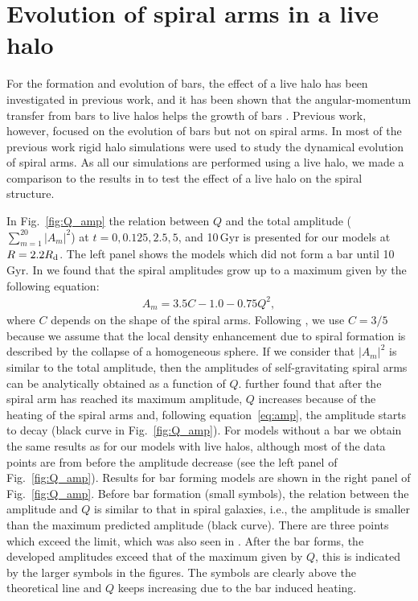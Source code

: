 

\section[]{Evolution of spiral arms in a live halo}
\label{Sect:AppB}

For the formation and evolution of bars, the effect of a
live halo has been investigated in previous work, and
it has been shown that the angular-momentum transfer from bars to
live halos helps the growth of bars
\citep{2000ApJ...543..704D,2002ApJ...569L..83A,2003MNRAS.341.1179A}.
Previous work, however, focused on the evolution of bars but
not on spiral arms. 
In most of the previous work rigid halo simulations were used
to study the dynamical evolution of spiral arms. As all
our simulations are performed using a live halo, we made
a comparison to the results in \citet{2011ApJ...730..109F}
to test the effect of a live halo on the spiral structure.


In Fig.~\ref{fig:Q_amp} the relation between $Q$ and
the total amplitude ($\sum _{m=1}^{20}|A_m|^2$) at  $t=0, 0.125, 2.5, 5$, 
and 10\,Gyr is presented for our models at $R=2.2R_{\rm d}$.
The left panel shows the models which did not form a bar until 10\,Gyr. 
In \citet{2011ApJ...730..109F} we found that the spiral amplitudes
grow up to a maximum given by the following equation:
\begin{eqnarray}
A_{m} = 3.5C - 1.0 - 0.75Q^2,
\label{eq:amp}
\end{eqnarray}
where $C$ depends on the shape of the spiral arms. 
Following \citet{2011ApJ...730..109F}, we use $C=3/5$ because we assume that the local 
density enhancement due to spiral formation is described by the collapse 
of a homogeneous sphere.
If we consider that $|A_m|^2$ is similar to
the total amplitude, then the amplitudes of self-gravitating 
spiral arms can be analytically obtained as a function of $Q$. 
\citet{2011ApJ...730..109F} further found that after the spiral arm has 
reached its maximum amplitude, $Q$ increases because of the heating of 
the spiral arms and, following equation~\ref{eq:amp}, the amplitude starts to 
decay (black curve in Fig.~\ref{fig:Q_amp}).
For models without a bar we obtain the same results as for our 
models with live halos, although most of the data points are from before 
the amplitude decrease (see the left panel of Fig.~\ref{fig:Q_amp}).
Results for bar forming models are shown in the right panel of Fig.~\ref{fig:Q_amp}.
Before bar formation (small symbols), the relation between the
amplitude and $Q$ is similar to that in spiral galaxies, i.e., the amplitude
is smaller than the maximum predicted amplitude (black curve).
There are three points which exceed the limit, which was also seen in
\citet{2011ApJ...730..109F}.
After the bar forms, the developed amplitudes exceed that of the 
maximum given by $Q$, this is indicated by the larger symbols in the figures. 
The symbols are clearly above the theoretical line and $Q$ keeps increasing due
to the bar induced heating.

